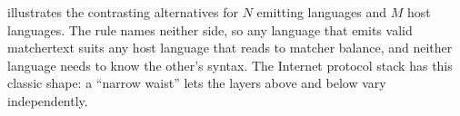  illustrates the contrasting alternatives
for $N$ emitting languages and $M$
host languages. The rule names neither side, so any language that emits valid
matchertext suits any host language that reads to matcher balance,
and neither language needs to know the other's syntax.
The Internet protocol stack has this classic shape:
a ``narrow waist'' lets the layers above and below vary independently.
